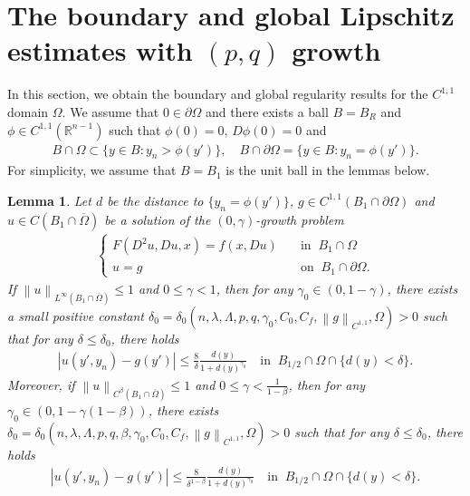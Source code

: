 \documentclass[reqno]{amsart}
\theoremstyle{plain}
\newtheorem{lem}{Lemma}[section]
\theoremstyle{definition}
\theoremstyle{remark}
\newcommand{\norm}[1]{\left\lVert#1\right\rVert}
\numberwithin{equation}{section}
\begin{document}
\section{The boundary and global Lipschitz estimates with $(p,q)$ growth} \label{sec4}
In this section, we obtain the boundary and global regularity results for the $C^{1,1}$ domain $\Omega$.
We assume that $0\in \partial\Omega$ and there exists a ball $B=B_R$ and $\phi \in C^{1,1}(\mathbb{R}^{n-1})$ such that $\phi(0)=0$, $D\phi(0) = 0$ and
\begin{align*}
    B\cap \Omega  \subset \{y\in B : y_n>\phi(y')\}, \quad B \cap \partial\Omega = \{ y \in B: y_n=\phi(y')\}.
\end{align*}
For simplicity, we assume that $B=B_1$ is the unit ball in the lemmas below.
\begin{lem} \label{bar}
    Let $d$ be the distance to $\{y_n = \phi(y')\}$, $g\in C^{1,1}(B_1\cap\partial\Omega)$ and $u \in C(B_1\cap\overline{\Omega })$ be a solution of the $(0,\gamma)$-growth problem
    \begin{align*}
        \begin{cases}
        F(D^2u,Du,x) = f(x,Du) \quad &\text{in } \ B_1\cap \Omega \\
        u=g\quad &\text{on } \ B_1\cap \partial \Omega.
        \end{cases}
    \end{align*} 
    If $\norm{u}_{L^\infty(B_1\cap\overline{\Omega})} \leq 1$ and $0\leq\gamma < 1$, then for any $\gamma_0 \in (0, 1-\gamma)$, there exists a small positive constant $\delta_0=\delta_0(n, \lambda, \Lambda, p, q, \gamma_0,C_0,C_f, \norm{g}_{C^{1,1}},\Omega)>0$ such that for any $\delta\leq\delta_0$, there holds
    \begin{align*}
        |u(y',y_n)-g(y')| \leq \frac{8}{\delta}\frac{d(y)}{1+d(y)^{\gamma_0}} \quad \text{in } \ B_{1/2} \cap\Omega \cap \{d(y)<\delta\}.
    \end{align*}
    Moreover, if $\norm{u}_{C^\beta(B_1\cap\overline{\Omega})} \leq 1$ and $0\leq\gamma < \frac{1}{1-\beta}$, then for any $\gamma_0 \in (0, 1-\gamma(1-\beta))$, there exists $\delta_0=\delta_0(n, \lambda, \Lambda, p, q, \beta, \gamma_0, C_0, C_f, \norm{g}_{C^{1,1}},\Omega)>0$ such that for any $\delta\leq \delta_0$, there holds
    \begin{align*}
        |u(y',y_n)-g(y')| \leq \frac{8}{\delta^{1-\beta}}\frac{d(y)}{1+d(y)^{\gamma_0}} \quad \text{in } \ B_{1/2} \cap\Omega \cap \{d(y)<\delta\}.
    \end{align*}
\end{lem}
\end{document}
